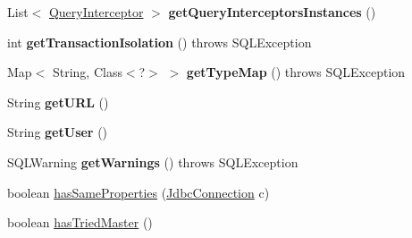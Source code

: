 \begin{DoxyCompactItemize}
\mbox{\label{classcom_1_1mysql_1_1cj_1_1jdbc_1_1ha_1_1_multi_host_my_s_q_l_connection_ab5bdebf96a1fc7125bc76560cf57d1bf}} 
List$<$ \mbox{\hyperlink{interfacecom_1_1mysql_1_1cj_1_1interceptors_1_1_query_interceptor}{Query\+Interceptor}} $>$ {\bfseries get\+Query\+Interceptors\+Instances} ()
\item 
\mbox{\label{classcom_1_1mysql_1_1cj_1_1jdbc_1_1ha_1_1_multi_host_my_s_q_l_connection_aadcad9f3a3afcc4326191c01257736fe}} 
int {\bfseries get\+Transaction\+Isolation} ()  throws S\+Q\+L\+Exception 
\item 
\mbox{\label{classcom_1_1mysql_1_1cj_1_1jdbc_1_1ha_1_1_multi_host_my_s_q_l_connection_a58a733e4a7e82b8f7dd8b218f57dd0e8}} 
Map$<$ String, Class$<$?$>$ $>$ {\bfseries get\+Type\+Map} ()  throws S\+Q\+L\+Exception 
\item 
\mbox{\label{classcom_1_1mysql_1_1cj_1_1jdbc_1_1ha_1_1_multi_host_my_s_q_l_connection_a52febdf3fd28e122d17a8f0713427fa6}} 
String {\bfseries get\+U\+RL} ()
\item 
\mbox{\label{classcom_1_1mysql_1_1cj_1_1jdbc_1_1ha_1_1_multi_host_my_s_q_l_connection_a3e6181cd20398fc2968c8ea0204f7c95}} 
String {\bfseries get\+User} ()
\item 
\mbox{\label{classcom_1_1mysql_1_1cj_1_1jdbc_1_1ha_1_1_multi_host_my_s_q_l_connection_a223c3d0b682be6c82b4e86cd9880711f}} 
S\+Q\+L\+Warning {\bfseries get\+Warnings} ()  throws S\+Q\+L\+Exception 
\item 
boolean \mbox{\hyperlink{classcom_1_1mysql_1_1cj_1_1jdbc_1_1ha_1_1_multi_host_my_s_q_l_connection_a149e10365c36e34d7585bc42515e2fcf}{has\+Same\+Properties}} (\mbox{\hyperlink{interfacecom_1_1mysql_1_1cj_1_1jdbc_1_1_jdbc_connection}{Jdbc\+Connection}} c)
\item 
boolean \mbox{\hyperlink{classcom_1_1mysql_1_1cj_1_1jdbc_1_1ha_1_1_multi_host_my_s_q_l_connection_a2eb48d606b888ae970ca17640c54b082}{has\+Tried\+Master}} ()

\end{DoxyCompactItemize}
